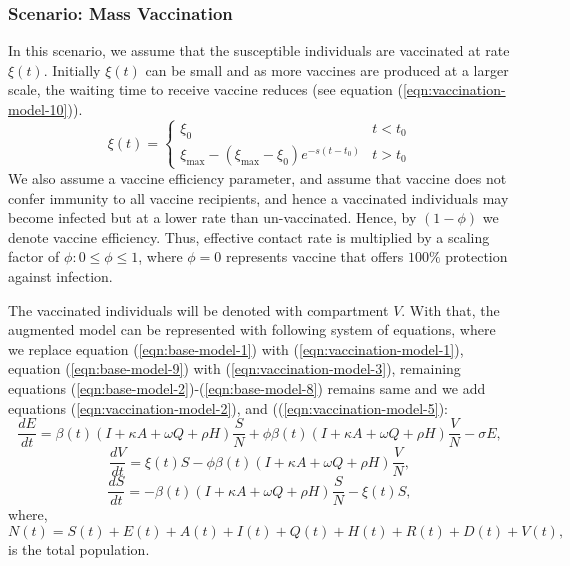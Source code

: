 \documentclass[authoryear,preprint]{elsarticle}
\begin{document}
\subsubsection{Scenario: Mass Vaccination }
In this scenario, we assume that the susceptible individuals are vaccinated at rate $\xi(t)$. Initially $\xi(t)$ can be small and as more vaccines are produced at a larger scale, the waiting time to receive vaccine reduces (see equation (\ref{eqn:vaccination-model-10})). 
%
%
\begin{equation}
 \xi(t) = 
\begin{cases}
\xi_0 & t < t_0 \\
\xi_{\max} - (\xi_{\max} - \xi_0) e^{-s \left( t-t_0\right) } & t > t_0
\end{cases}
\label{eqn:vaccination-model-10}
\end{equation}
%
%
We also assume a vaccine efficiency parameter, and assume that vaccine does not confer immunity to all vaccine recipients, and hence a vaccinated individuals may become infected but at a lower rate than un-vaccinated. Hence, by $(1-\phi)$ we denote vaccine efficiency. Thus, effective contact rate is multiplied by a scaling factor of $\phi : 0 \leq \phi \leq 1$, where $\phi = 0$ represents vaccine that offers $100\%$ protection against infection.

The vaccinated individuals will be denoted with compartment $V$. With that, the augmented model can be represented with following system of equations, where we replace equation (\ref{eqn:base-model-1}) with (\ref{eqn:vaccination-model-1}), equation (\ref{eqn:base-model-9}) with (\ref{eqn:vaccination-model-3}), remaining equations (\ref{eqn:base-model-2})-(\ref{eqn:base-model-8}) remains same and we add equations (\ref{eqn:vaccination-model-2}), and ((\ref{eqn:vaccination-model-5}):
%
%
\begin{equation}
\frac{dE}{dt} = \beta(t) \left( I + \kappa A + \omega Q + \rho H \right) \frac{S}{N} + \phi \beta(t) \left( I + \kappa A + \omega Q + \rho H \right) \frac{V}{N} - \sigma E, 
\label{eqn:vaccination-model-1}
\end{equation}
%
%
\begin{equation}
\frac{dV}{dt} =  \xi(t) S - \phi  \beta(t) \left( I + \kappa A + \omega Q + \rho H \right) \frac{V}{N},
\label{eqn:vaccination-model-2}
\end{equation}
\begin{equation}
\frac{dS}{dt} = -\beta(t) \left( I + \kappa A + \omega Q + \rho H \right) \frac{S}{N} - \xi(t) S,
\label{eqn:vaccination-model-3}
\end{equation}
%
%
where,
\begin{equation}
N(t) = S(t) + E(t) + A(t) + I(t) + Q(t) + H(t) + R(t) + D(t) + V(t),
\label{eqn:vaccination-model-5}
\end{equation}
is the total population. 
\end{document}
